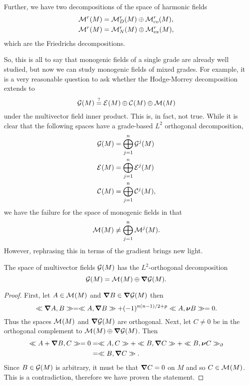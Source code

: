 Further, we have two decompositions of the space of harmonic fields 
\begin{align}
    \mathcal{M}^{r}(M) &= \mathcal{M}^{r}_D(M) \oplus \mathcal{M}^{r}_{\textrm{co}}(M), \\
    \mathcal{M}^{r}(M) &= \mathcal{M}^{r}_N(M) \oplus \mathcal{M}^{r}_{\textrm{ex}}(M),
\end{align}
which are the Friedrichs decompositions.

So, this is all to say that monogenic fields of a single grade are already well studied, but now we can study monogenic fields of mixed grades. For example, it is a very reasonable question to ask whether the Hodge-Morrey decomposition extends to
    \begin{equation}
        \mathcal{G}(M) \stackrel{?}{=} \mathcal{E}^{}(M) \oplus \mathcal{C}^{}(M) \oplus \mathcal{M}^{}(M)
    \end{equation} 
under the multivector field inner product. This is, in fact, not true.  While it is clear that the following spaces have a grade-based $L^2$ orthogonal decomposition,
\begin{align}
    \mathcal{G}(M) &= \bigoplus_{j=1}^n \mathcal{G}^j(M)\\
    \mathcal{E}^{}(M) &= \bigoplus_{j=1}^n \mathcal{E}^{j}(M)\\
    \mathcal{C}^{}(M) &= \bigoplus_{j=1}^n \mathcal{C}^{j}(M),
\end{align}
we have the failure for the space of monogenic fields in that
\begin{equation}
    \mathcal{M}^{}(M) \neq \bigoplus_{j=1}^n \mathcal{M}^{j}(M).
\end{equation}
However, rephrasing this in terms of the gradient brings new light.
\begin{theorem}
The space of multivector fields $\mathcal{G}(M)$ has the $L^2$-orthogonal decomposition
\begin{equation}
\mathcal{G}(M) = \mathcal{M}^{}(M) \oplus \boldsymbol{\nabla} \mathcal{G}(M).
\end{equation}
\end{theorem}
\begin{proof}
First, let $A \in \mathcal{M}^{}(M)$ and $\boldsymbol{\nabla} B\in \boldsymbol{\nabla} \mathcal{G}(M)$ then
\begin{equation}
\ll \boldsymbol{\nabla} A, B\gg = \ll A, \boldsymbol{\nabla} B\gg + (-1)^{n(n-1)/2+p} \ll A, \boldsymbol{\nu} B\gg = 0.
\end{equation}
Thus the spaces $\mathcal{M}^{}(M)$ and $\boldsymbol{\nabla} \mathcal{G}(M)$ are orthogonal. Next, let $C\neq 0$ be in the orthogonal complement to $\mathcal{M}^{}(M) \oplus \boldsymbol{\nabla} \mathcal{G}(M)$. Then
\begin{align}
\ll A+\boldsymbol{\nabla} B, C\gg=0&= \ll A, C\gg+\ll B, \boldsymbol{\nabla} C\gg+\ll B, \boldsymbol{\nu} C\gg_\partial\\
&=\ll B, \boldsymbol{\nabla} C\gg.
\end{align}
Since $B\in \mathcal{G}(M)$ is arbitrary, it must be that $\boldsymbol{\nabla} C = 0$ on $M$ and so $C \in \mathcal{M}^{}(M)$.  This is a contradiction, therefore we have proven the statement.
\end{proof}

